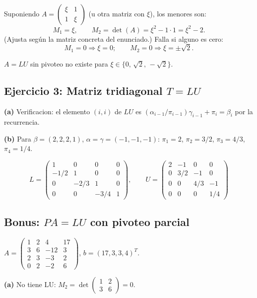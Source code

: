 \documentclass[11pt,a4paper]{article}
\begin{document}
Suponiendo $A = \begin{pmatrix}\xi & 1 \\ 1 & \xi\end{pmatrix}$ (u otra matriz con $\xi$), los menores son:
\[
  M_1 = \xi, \qquad M_2 = \det(A) = \xi^2 - 1\cdot 1 = \xi^2 - 2.
\]
(Ajusta según la matriz concreta del enunciado.) Falla si alguno es cero:
\[
  M_1=0 \Rightarrow \xi=0; \qquad M_2=0 \Rightarrow \xi = \pm\sqrt{2}.
\]
\begin{tcolorbox}[clave]
$A=LU$ sin pivoteo no existe para $\xi \in \{0,\,\sqrt{2},\,-\sqrt{2}\}$.
\end{tcolorbox}

\subsection{Ejercicio 3: Matriz tridiagonal $T = LU$}
\label{sec:practica_lu_3}

\textbf{(a)} Verificacion: el elemento $(i,i)$ de $LU$ es
$(\alpha_{i-1}/\pi_{i-1})\gamma_{i-1} + \pi_i = \beta_i$ por la recurrencia.

\textbf{(b)} Para $\beta=(2,2,2,1)$, $\alpha=\gamma=(-1,-1,-1)$:
$\pi_1=2$, $\pi_2=3/2$, $\pi_3=4/3$, $\pi_4=1/4$.

\[
  L = \begin{pmatrix}1&0&0&0\\-1/2&1&0&0\\0&-2/3&1&0\\0&0&-3/4&1\end{pmatrix}, \qquad
  U = \begin{pmatrix}2&-1&0&0\\0&3/2&-1&0\\0&0&4/3&-1\\0&0&0&1/4\end{pmatrix}
\]

\subsection{Bonus: $PA=LU$ con pivoteo parcial}
\label{sec:practica_lu_bonus}

$A = \begin{pmatrix}1&2&4&17\\3&6&-12&3\\2&3&-3&2\\0&2&-2&6\end{pmatrix}$,
$b=(17,3,3,4)^T$.

\textbf{(a)} No tiene LU: $M_2=\det\left(\begin{smallmatrix}1&2\\3&6\end{smallmatrix}\right)=0$.
\end{document}
